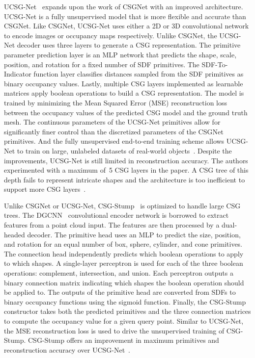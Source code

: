UCSG-Net~\cite{Kania2020} expands upon the work of CSGNet with an improved architecture. UCSG-Net is a fully unsupervised model that is more flexible and accurate than CSGNet. Like CSGNet, UCSG-Net uses either a 2D or 3D convolutional network to encode images or occupancy maps respectively. Unlike CSGNet, the UCSG-Net decoder uses three layers to generate a CSG representation. The primitive parameter prediction layer is an MLP network that predicts the shape, scale, position, and rotation for a fixed number of SDF primitives. The SDF-To-Indicator function layer classifies distances sampled from the SDF primitives as binary occupancy values. Lastly, multiple CSG layers implemented as learnable matrices apply boolean operations to build a CSG representation. The model is trained by minimizing the Mean Squared Error (MSE) reconstruction loss between the occupancy values of the predicted CSG model and the ground truth mesh. The continuous parameters of the UCSG-Net primitives allow for significantly finer control than the discretized parameters of the CSGNet primitives. And the fully unsupervised end-to-end training scheme allows UCSG-Net to train on large, unlabeled datasets of real-world objects~\cite{Kania2020}. Despite the improvements, UCSG-Net is still limited in reconstruction accuracy. The authors experimented with a maximum of~5 CSG layers in the paper. A CSG tree of this depth fails to represent intricate shapes and the architecture is too inefficient to support more CSG layers~\cite{Ren2021}.

Unlike CSGNet or UCSG-Net, CSG-Stump~\cite{Ren2021} is optimized to handle large CSG trees. The DGCNN~\cite{Wang2019b} convolutional encoder network is borrowed to extract features from a point cloud input. The features are then processed by a dual-headed decoder. The primitive head uses an MLP to predict the size, position, and rotation for an equal number of box, sphere, cylinder, and cone primitives. The connection head independently predicts which boolean operations to apply to which shapes. A single-layer perceptron is used for each of the three boolean operations: complement, intersection, and union. Each perceptron outputs a binary connection matrix indicating which shapes the boolean operation should be applied to. The outputs of the primitive head are converted from SDFs to binary occupancy functions using the sigmoid function. Finally, the CSG-Stump constructor takes both the predicted primitives and the three connection matrices to compute the occupancy value for a given query point. Similar to UCSG-Net, the MSE reconstruction loss is used to drive the unsupervised training of CSG-Stump. CSG-Stump offers an improvement in maximum primitives and reconstruction accuracy over UCSG-Net~\cite{Ren2021}.
